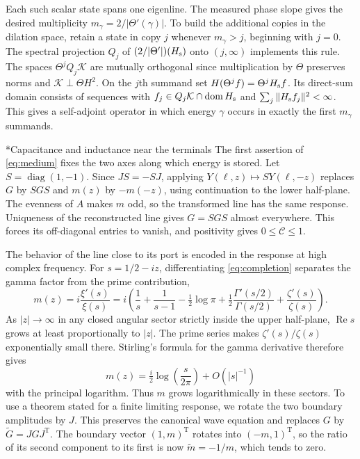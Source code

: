 \documentclass[11pt,letterpaper]{article}
\makeatletter
\renewcommand\subsection{\@startsection{subsection}{2}{\z@}{-2.0ex plus -.3ex}{.75ex}{\normalfont\normalsize\itshape}}
\numberwithin{equation}{section}
\makeatother
\begin{document}
Each such scalar state spans one eigenline. The measured phase slope gives the desired multiplicity $m_\gamma=2/|\Theta'(\gamma)|$. To build the additional copies in the dilation space, retain a state in copy $j$ whenever $m_\gamma>j$, beginning with $j=0$. The spectral projection $Q_j$ of $(2/|\Theta'|)(H_{\rm s})$ onto $(j,\infty)$ implements this rule. The spaces $\Theta^j Q_j\mathcal K$ are mutually orthogonal since multiplication by $\Theta$ preserves norms and $\mathcal K\perp\Theta H^2$. On the $j$th summand set $H(\Theta^j f)=\Theta^jH_{\rm s}f$. Its direct-sum domain consists of sequences with $f_j\in Q_j\mathcal K\cap\operatorname{dom}H_{\rm s}$ and $\sum_j\|H_{\rm s}f_j\|^2<\infty$. This gives a self-adjoint operator in which energy $\gamma$ occurs in exactly the first $m_\gamma$ summands.

\subsection*{Capacitance and inductance near the terminals}
The first assertion of \eqref{eq:medium} fixes the two axes along which energy is stored.
Let $S=\operatorname{diag}(1,-1)$. Since $JS=-SJ$, applying $Y(\ell,z)\mapsto S Y(\ell,-z)$ replaces $G$ by $SGS$ and $m(z)$ by $-m(-z)$, using continuation to the lower half-plane. The evenness of $A$ makes $m$ odd, so the transformed line has the same response. Uniqueness of the reconstructed line gives $G=SGS$ almost everywhere. This forces its off-diagonal entries to vanish, and positivity gives $0\le\mathcal C\le1$.

The behavior of the line close to its port is encoded in the response at high complex frequency. For $s=1/2-iz$, differentiating \eqref{eq:completion} separates the gamma factor from the prime contribution,
\[
 m(z)=i\frac{\xi'(s)}{\xi(s)}
   =i\left(\frac1s+\frac1{s-1}-\tfrac12\log\pi
      +\tfrac12\frac{\Gamma'(s/2)}{\Gamma(s/2)}
      +\frac{\zeta'(s)}{\zeta(s)}\right).
\]
As $|z|\to\infty$ in any closed angular sector strictly inside the upper half-plane, $\operatorname{Re}s$ grows at least proportionally to $|z|$. The prime series makes $\zeta'(s)/\zeta(s)$ exponentially small there. Stirling's formula for the gamma derivative therefore gives
\[
 m(z)=\tfrac i2\log\!\left(\frac{s}{2\pi}\right)+O(|s|^{-1})
\]
with the principal logarithm. Thus $m$ grows logarithmically in these sectors. To use a theorem stated for a finite limiting response, we rotate the two boundary amplitudes by $J$. This preserves the canonical wave equation and replaces $G$ by $\widetilde G=JGJ^{\mathrm T}$. The boundary vector $(1,m)^{\mathrm T}$ rotates into $(-m,1)^{\mathrm T}$, so the ratio of its second component to its first is now $\widetilde m=-1/m$, which tends to zero.
\end{document}
